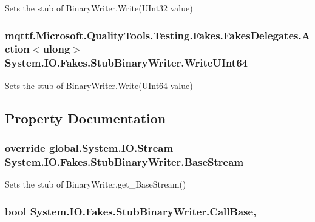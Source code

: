 Sets the stub of Binary\-Writer.\-Write(\-U\-Int32 value)

\hypertarget{class_system_1_1_i_o_1_1_fakes_1_1_stub_binary_writer_a9f6288c6ac3944062b0b9d9a741ba4bb}{
\subsubsection[{Write\-U\-Int64}]{\setlength{\rightskip}{0pt plus 5cm}mqttf.\-Microsoft.\-Quality\-Tools.\-Testing.\-Fakes.\-Fakes\-Delegates.\-Action$<$ulong$>$ System.\-I\-O.\-Fakes.\-Stub\-Binary\-Writer.\-Write\-U\-Int64}}\label{class_system_1_1_i_o_1_1_fakes_1_1_stub_binary_writer_a9f6288c6ac3944062b0b9d9a741ba4bb}


Sets the stub of Binary\-Writer.\-Write(\-U\-Int64 value)



\subsection{Property Documentation}
\hypertarget{class_system_1_1_i_o_1_1_fakes_1_1_stub_binary_writer_abe144550f09e0c2b8dce7255ff717a4c}{
\subsubsection[{Base\-Stream}]{\setlength{\rightskip}{0pt plus 5cm}override global.\-System.\-I\-O.\-Stream System.\-I\-O.\-Fakes.\-Stub\-Binary\-Writer.\-Base\-Stream\hspace{0.3cm}{\ttfamily [get]}}}\label{class_system_1_1_i_o_1_1_fakes_1_1_stub_binary_writer_abe144550f09e0c2b8dce7255ff717a4c}


Sets the stub of Binary\-Writer.\-get\-\_\-\-Base\-Stream()

\hypertarget{class_system_1_1_i_o_1_1_fakes_1_1_stub_binary_writer_ab41f085bb0cc22db549ad7f7a57e4fc5}{
\subsubsection[{Call\-Base}]{\setlength{\rightskip}{0pt plus 5cm}bool System.\-I\-O.\-Fakes.\-Stub\-Binary\-Writer.\-Call\-Base\hspace{0.3cm}{\ttfamily [get]}, {\ttfamily [set]}}}\label{class_system_1_1_i_o_1_1_fakes_1_1_stub_binary_writer_ab41f085bb0cc22db549ad7f7a57e4fc5}


